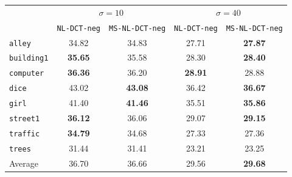 \documentclass{ipol}
\begin{document}
\begin{center}
\begin{tabular}{l | c c | c c }
								 &\multicolumn{2}{c|}{$\sigma = 10$}&\multicolumn{2}{c}{$\sigma = 40$} \\
                         & {\tt NL-DCT-neg}&{\tt MS-NL-DCT-neg} &{\tt NL-DCT-neg} &{\tt MS-NL-DCT-neg} \\\hline
		\texttt{alley    } & {    34.82} & {    34.83}    & {    27.71} & {\bf 27.87}    \\
		\texttt{building1} & {\bf 35.65} & {    35.58}    & {    28.30} & {\bf 28.40}    \\
		\texttt{computer } & {\bf 36.36} & {    36.20}    & {\bf 28.91} & {    28.88}    \\
		\texttt{dice     } & {    43.02} & {\bf 43.08}    & {    36.42} & {\bf 36.67}    \\
		\texttt{girl     } & {    41.40} & {\bf 41.46}    & {    35.51} & {\bf 35.86}    \\
		\texttt{street1  } & {\bf 36.12} & {    36.06}    & {    29.07} & {\bf 29.15}    \\
		\texttt{traffic  } & {\bf 34.79} & {    34.68}    & {    27.33} & {    27.36}    \\
		\texttt{trees    } & {    31.44} & {    31.41}    & {    23.21} & {    23.25}    \\\hline
		Average            & {    36.70} & {    36.66}    & {    29.56} & {\bf 29.68}    \\
\end{tabular}
\end{center}
\end{document}

